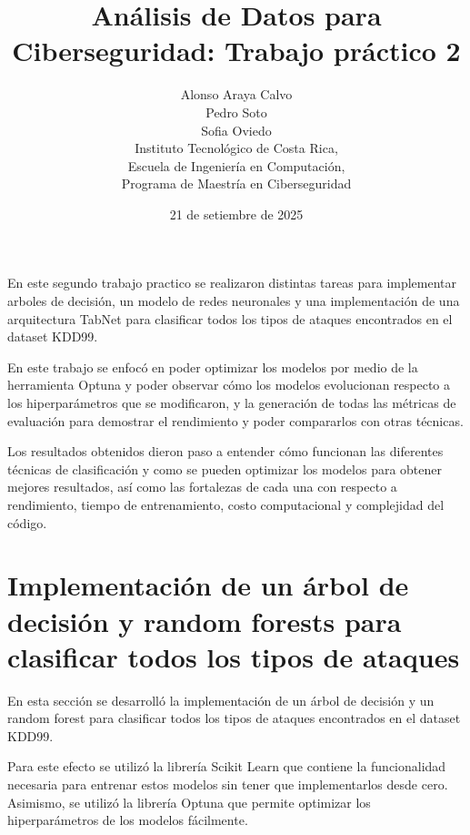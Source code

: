 \documentclass[12pt,a4paper]{article}
\begin{document}
\title{Análisis de Datos para Ciberseguridad: Trabajo práctico 2}

\author{
  Alonso Araya Calvo \\
  Pedro Soto \\
  Sofia Oviedo \\
  Instituto Tecnológico de Costa Rica, \\
  Escuela de Ingeniería en Computación, \\
  Programa de Maestría en Ciberseguridad
}

\date{ 21 de setiembre de 2025 }
\maketitle

En este segundo trabajo practico se realizaron distintas tareas para implementar arboles de decisión, un modelo
de redes neuronales y una implementación de una arquitectura TabNet para clasificar todos los tipos de ataques encontrados en el dataset KDD99.

En este trabajo se enfocó en poder optimizar los modelos por medio de la herramienta Optuna y poder observar cómo los modelos evolucionan
respecto a los hiperparámetros que se modificaron, y la generación de todas las métricas de evaluación para demostrar
el rendimiento y poder compararlos con otras técnicas.

Los resultados obtenidos dieron paso a entender cómo funcionan las diferentes técnicas de clasificación y como se pueden optimizar los modelos para obtener mejores resultados,
así como las fortalezas de cada una con respecto a rendimiento, tiempo de entrenamiento, costo computacional y complejidad del código.

\section{Implementación de un árbol de decisión
  y random forests para clasificar todos los
tipos de ataques}

En esta sección se desarrolló la implementación de un árbol de decisión y
un random forest para clasificar todos los tipos de ataques encontrados en el dataset KDD99.

Para este efecto se utilizó la librería Scikit Learn que contiene la funcionalidad necesaria para
entrenar estos modelos sin tener que implementarlos desde cero. Asimismo, se utilizó la librería
Optuna que permite optimizar los hiperparámetros de los modelos fácilmente.
\end{document}
